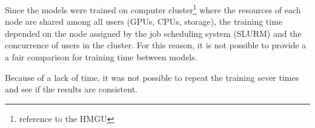 
\glsresetall
\graphicspath{{./Sections/Results/Resources/}}

Since the models were trained on computer cluster\footnote{reference to the HMGU} where the resources of each node are shared among all users (GPUs, CPUs, storage), the training time depended on the node assigned by the job scheduling system (SLURM) and the concurrence of users in the cluster. For this reason, it is not possible to provide a a fair comparison for training time between models.

Because of a lack of time, it was not possible to repeat the training sever times and see if the results are consistent.
